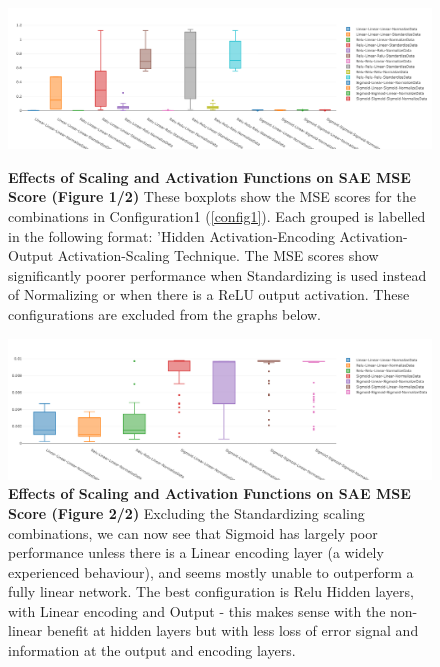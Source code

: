 \documentclass[a4paper,latin]{paper}
\begin{document}
\begin{figure}[H]
	\centering
	\begin{minipage}{0.45\textwidth}
		\centering 
		\includegraphics[scale=0.2]{images/iteration_two/linear/0Scaling_and_Activation_Combos_Min_MSE.png}
		\caption{\textbf{Effects of Scaling and Activation Functions on SAE MSE Score (Figure 1/2)}
			\newline These boxplots show the MSE scores for the combinations in Configuration1 (\ref{config1}). Each grouped is labelled in the following format: 'Hidden Activation-Encoding Activation-Output Activation-Scaling Technique. The MSE scores show significantly poorer performance when Standardizing is used instead of Normalizing or when there is a ReLU output activation. These configurations are excluded from the graphs below.}
		\label{figure-results-scaling-and-relu}
	\end{minipage}\hfill
	\begin{minipage}{0.45\textwidth}
		\centering 
		\includegraphics[scale=0.2]{images/iteration_two/linear/1Activation_Combos-Min_MSE.png}
		\caption{\textbf{Effects of Scaling and Activation Functions on SAE MSE Score (Figure 2/2)} 
			\newline Excluding the Standardizing scaling combinations, we can now see that Sigmoid has largely poor performance unless there is a Linear encoding layer (a widely experienced behaviour), and seems mostly unable to outperform a fully linear network. The best configuration is Relu Hidden layers, with Linear encoding and Output - this makes sense with the non-linear benefit at hidden layers but with less loss of error signal and information at the output and encoding layers.}
		\label{figure-results-linear-act}
	\end{minipage}
\end{figure}
\end{document}
